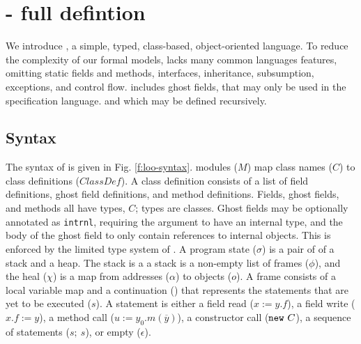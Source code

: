 
\section{\LangOO - full defintion}
\label{app:loo}


We introduce \LangOO, a simple, typed, class-based, object-oriented language.
To reduce the complexity of our formal models, \LangOO lacks many
common languages features, omitting static fields and methods, interfaces,
inheritance, subsumption, exceptions, and control flow.  
 \LangOO includes ghost fields,  that may only be used in the specification language.
and which may be defined recursively.
%


\subsection{Syntax}
The syntax of \LangOO is given in Fig. \ref{f:loo-syntax}.
\LangOO modules ($M$) map class names ($C$) to class definitions ($\textit{ClassDef}$).
A class definition consists of %
a list of field definitions, ghost field definitions, and method definitions.
{Fields, ghost fields, and methods all have types, $C$; {types are
    classes}.
    Ghost fields may be optionally 
 annotated as \texttt{intrnl}, requiring the argument to have an internal type, and the 
body of the ghost field to only contain references to internal objects. This is enforced by the
limited type system of \LangOO.}
A program state ($\sigma$) is a pair of of a stack and a heap.
The stack is a a stack is a non-empty list of frames ($\phi$), and the heal ($\chi$)
is a map from addresses ($\alpha$) to objects ($o$). A frame consists of a local variable
map and a continuation () that represents the statements that are yet to be executed ($s$).
A statement is either a field read ($x := y.f$), a field write ($x.f := y$), a method call
($u :=y_0.m(\overline{y})$), a constructor call ($\mbox{\normalfont{\texttt{new}}}\ C$), 
  a sequence of statements ($s;\ s$),
  or empty ($\epsilon$).


